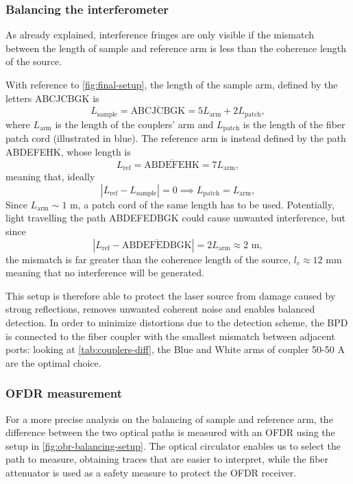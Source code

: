 \subsubsection{Balancing the interferometer}
As already explained, interference fringes are only visible if the mismatch between the length of sample and reference arm is less than the coherence length of the source.

With reference to \autoref{fig:final-setup}, the length of the sample arm, defined by the letters ABCJCBGK is
\begin{equation}
L_{\text{sample}} = \overline{\text{ABCJCBGK}} = 5L_{\text{arm}} + 2L_{\text{patch}},
\end{equation}
where $L_{\text{arm}}$ is the length of the couplers' arm and $L_{\text{patch}}$ is the length of the fiber patch cord (illustrated in blue). The reference arm is instead defined by the path ABDEFEHK, whose length is
\begin{equation}
	L_{\text{ref}} = \overline{\text{ABDEFEHK}} = 7L_{\text{arm}},
\end{equation}
meaning that, ideally
\begin{equation}
	| L_{\text{ref}} - L_{\text{sample}}| = 0 \implies L_{\text{patch}} = L_{\text{arm}},
\end{equation}
Since $L_{\text{arm}} \sim 1$ m, a patch cord of the same length has to be used. Potentially, light travelling the path ABDEFEDBGK could cause unwanted interference, but since
\begin{equation}
| L_{\text{ref}} - \overline{\text{ABDEFEDBGK}}| = 2L_{\text{arm}} \approx 2 \text{ m},
\end{equation}
the mismatch is far greater than the coherence length of the source, $l_c \approx 12$ mm meaning that no interference will be generated. 

This setup is therefore able to protect the laser source from damage caused by strong reflections, removes unwanted coherent noise and enables balanced detection. In order to minimize distortions due to the detection scheme, the BPD is connected to the fiber coupler with the smallest mismatch between adjacent ports: looking at \autoref{tab:couplers-diff}, the Blue and White arms of coupler 50-50 A are the optimal choice. 

\subsubsection{OFDR measurement}

For a more precise analysis on the balancing of sample and reference arm, the difference between the two optical paths is measured with an OFDR using the setup in \autoref{fig:obr-balancing-setup}. The optical circulator enables us to select the path to measure, obtaining traces that are easier to interpret, while the fiber attenuator is used as a safety measure to protect the OFDR receiver. 


